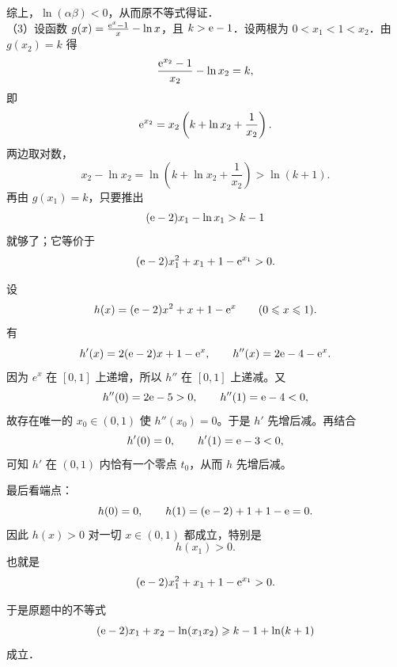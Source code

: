 \begin{solution}
综上，$\ln(\alpha\beta)<0$，从而原不等式得证．\\
（3）设函数 $g(x) = \frac{\mathrm{e}^x - 1}{x} - \ln x$，且 $k > \mathrm{e} - 1$．设两根为 $0 < x_1 < 1 < x_2$．由 $g(x_2) = k$ 得
\[
\frac{\mathrm{e}^{x_2} - 1}{x_2} - \ln x_2 = k,
\]
即
\[
\mathrm{e}^{x_2} = x_2\left(k + \ln x_2 + \frac{1}{x_2}\right).
\]
两边取对数，
\[
x_2 - \ln x_2 = \ln\left(k + \ln x_2 + \frac{1}{x_2}\right) > \ln(k+1).
\]
再由 $g(x_1)=k$，只要推出
\[
(\mathrm{e}-2)x_1 - \ln x_1 > k - 1
\]
就够了；它等价于
\[
(\mathrm{e}-2)x_1^2 + x_1 + 1 - \mathrm{e}^{x_1} > 0.
\]

设
\[
h(x) = (\mathrm{e}-2)x^2 + x + 1 - \mathrm{e}^x\qquad (0 \leqslant x \leqslant 1).
\]
有
\[
h'(x) = 2(\mathrm{e}-2)x + 1 - \mathrm{e}^x,\qquad h''(x) = 2\mathrm{e} - 4 - \mathrm{e}^x.
\]
因为 \(e^x\) 在 \([0,1]\) 上递增，所以 \(h''\) 在 \([0,1]\) 上递减。又
\[
h''(0)=2\mathrm{e}-5>0,\qquad h''(1)=\mathrm{e}-4<0,
\]
故存在唯一的 \(x_0\in(0,1)\) 使 \(h''(x_0)=0\)。于是 \(h'\) 先增后减。再结合
\[
h'(0)=0,\qquad h'(1)=\mathrm{e}-3<0,
\]
可知 \(h'\) 在 \((0,1)\) 内恰有一个零点 \(t_0\)，从而 \(h\) 先增后减。

最后看端点：
\[
h(0)=0,\qquad h(1)=(\mathrm{e}-2)+1+1-\mathrm{e}=0.
\]
因此 \(h(x)>0\) 对一切 \(x\in(0,1)\) 都成立，特别是
\[
h(x_1)>0.
\]
也就是
\[
(\mathrm{e}-2)x_1^2 + x_1 + 1 - \mathrm{e}^{x_1} > 0.
\]

于是原题中的不等式
\[
(\mathrm{e}-2)x_1+x_2-\ln(x_1x_2)\geqslant k-1+\ln(k+1)
\]
成立．
\end{solution}

